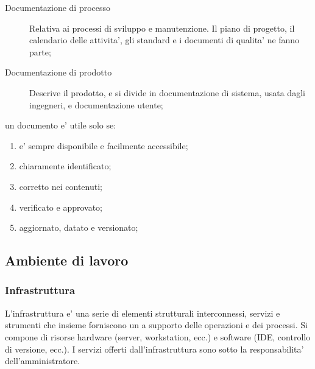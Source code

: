 \begin{description}
	\item[Documentazione di processo] Relativa ai processi di sviluppo e manutenzione. Il piano di progetto, il calendario delle attivita', gli standard e i documenti di qualita' ne fanno parte;
	\item[Documentazione di prodotto] Descrive il prodotto, e si divide in documentazione di sistema, usata dagli ingegneri, e documentazione utente;
\end{description}

un documento e' utile solo se:
\begin{enumerate}
	\item e' sempre disponibile e facilmente accessibile;
	\item chiaramente identificato;
	\item corretto nei contenuti;
	\item verificato e approvato;
	\item aggiornato, datato e versionato;
\end{enumerate}


\subsection{Ambiente di lavoro}

\subsubsection{Infrastruttura}
L'infrastruttura e' una serie di elementi strutturali interconnessi, servizi e strumenti che insieme forniscono un  a supporto delle operazioni e dei processi. Si compone di risorse hardware (server, workstation, ecc.) e software (IDE, controllo di versione, ecc.). I servizi offerti dall'infrastruttura sono sotto la responsabilita' dell'amministratore.

